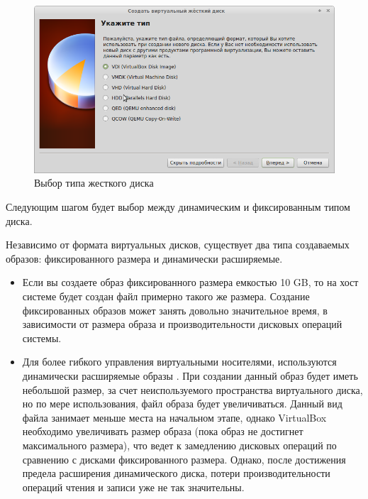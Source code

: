 \documentclass[12pt,a4paper]{article}
\begin{document}
\begin{figure}[h!]
\centering
\includegraphics[scale=0.45]{res/TypeOfHardDrive}
\caption{Выбор типа жесткого диска}
\end{figure}

Следующим шагом будет выбор между динамическим и фиксированным типом диска.

Независимо от формата виртуальных дисков, существует два типа создаваемых образов: фиксированного размера и динамически расширяемые.
\begin{itemize}
\item Если вы создаете образ фиксированного размера емкостью 10 GB, то на хост системе будет создан файл примерно такого же размера. Создание фиксированных образов может занять довольно значительное время, в зависимости от размера образа и производительности дисковых операций системы.
\item Для более гибкого управления виртуальными носителями, используются динамически расширяемые образы . При создании данный образ будет иметь небольшой размер, за счет неиспользуемого пространства виртуального диска, но по мере использования, файл образа будет увеличиваться. Данный вид файла занимает меньше места на начальном этапе, однако VirtualBox необходимо увеличивать размер образа (пока образ не достигнет максимального размера), что ведет к замедлению дисковых операций по сравнению с дисками фиксированного размера. Однако, после достижения предела расширения динамического диска, потери производительности операций чтения и записи уже не так значительны.
\end{itemize}
\end{document}
